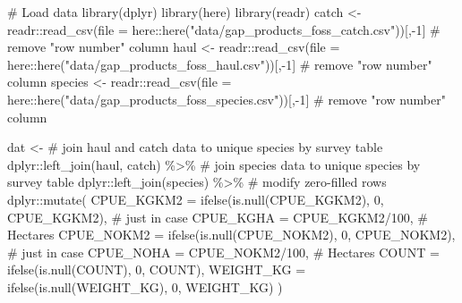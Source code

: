 \documentclass[
  letterpaper,
  oneside,
  open=any]{scrbook}
\newenvironment{Shaded}{\begin{snugshade}}{\end{snugshade}}
\newcommand{\AttributeTok}[1]{\textcolor[rgb]{0.40,0.45,0.13}{#1}}
\newcommand{\CommentTok}[1]{\textcolor[rgb]{0.37,0.37,0.37}{#1}}
\newcommand{\DecValTok}[1]{\textcolor[rgb]{0.68,0.00,0.00}{#1}}
\newcommand{\FunctionTok}[1]{\textcolor[rgb]{0.28,0.35,0.67}{#1}}
\newcommand{\NormalTok}[1]{\textcolor[rgb]{0.00,0.23,0.31}{#1}}
\newcommand{\OtherTok}[1]{\textcolor[rgb]{0.00,0.23,0.31}{#1}}
\newcommand{\SpecialCharTok}[1]{\textcolor[rgb]{0.37,0.37,0.37}{#1}}
\newcommand{\StringTok}[1]{\textcolor[rgb]{0.13,0.47,0.30}{#1}}
\begin{document}
\begin{Shaded}
\begin{Highlighting}[]
\CommentTok{\# Load data}
\FunctionTok{library}\NormalTok{(dplyr)}
\FunctionTok{library}\NormalTok{(here)}
\FunctionTok{library}\NormalTok{(readr)}
\NormalTok{catch }\OtherTok{\textless{}{-}}\NormalTok{ readr}\SpecialCharTok{::}\FunctionTok{read\_csv}\NormalTok{(}\AttributeTok{file =}\NormalTok{ here}\SpecialCharTok{::}\FunctionTok{here}\NormalTok{(}\StringTok{"data/gap\_products\_foss\_catch.csv"}\NormalTok{))[,}\SpecialCharTok{{-}}\DecValTok{1}\NormalTok{] }\CommentTok{\# remove "row number" column}
\NormalTok{haul }\OtherTok{\textless{}{-}}\NormalTok{ readr}\SpecialCharTok{::}\FunctionTok{read\_csv}\NormalTok{(}\AttributeTok{file =}\NormalTok{ here}\SpecialCharTok{::}\FunctionTok{here}\NormalTok{(}\StringTok{"data/gap\_products\_foss\_haul.csv"}\NormalTok{))[,}\SpecialCharTok{{-}}\DecValTok{1}\NormalTok{] }\CommentTok{\# remove "row number" column}
\NormalTok{species }\OtherTok{\textless{}{-}}\NormalTok{ readr}\SpecialCharTok{::}\FunctionTok{read\_csv}\NormalTok{(}\AttributeTok{file =}\NormalTok{ here}\SpecialCharTok{::}\FunctionTok{here}\NormalTok{(}\StringTok{"data/gap\_products\_foss\_species.csv"}\NormalTok{))[,}\SpecialCharTok{{-}}\DecValTok{1}\NormalTok{] }\CommentTok{\# remove "row number" column}

\NormalTok{dat }\OtherTok{\textless{}{-}} 
  \CommentTok{\# join haul and catch data to unique species by survey table}
\NormalTok{  dplyr}\SpecialCharTok{::}\FunctionTok{left\_join}\NormalTok{(haul, catch) }\SpecialCharTok{\%\textgreater{}\%} 
  \CommentTok{\# join species data to unique species by survey table}
\NormalTok{  dplyr}\SpecialCharTok{::}\FunctionTok{left\_join}\NormalTok{(species) }\SpecialCharTok{\%\textgreater{}\%} 
  \CommentTok{\# modify zero{-}filled rows}
\NormalTok{  dplyr}\SpecialCharTok{::}\FunctionTok{mutate}\NormalTok{(}
    \AttributeTok{CPUE\_KGKM2 =} \FunctionTok{ifelse}\NormalTok{(}\FunctionTok{is.null}\NormalTok{(CPUE\_KGKM2), }\DecValTok{0}\NormalTok{, CPUE\_KGKM2), }\CommentTok{\# just in case}
    \AttributeTok{CPUE\_KGHA =}\NormalTok{ CPUE\_KGKM2}\SpecialCharTok{/}\DecValTok{100}\NormalTok{, }\CommentTok{\# Hectares}
    \AttributeTok{CPUE\_NOKM2 =} \FunctionTok{ifelse}\NormalTok{(}\FunctionTok{is.null}\NormalTok{(CPUE\_NOKM2), }\DecValTok{0}\NormalTok{, CPUE\_NOKM2), }\CommentTok{\# just in case}
    \AttributeTok{CPUE\_NOHA =}\NormalTok{ CPUE\_NOKM2}\SpecialCharTok{/}\DecValTok{100}\NormalTok{, }\CommentTok{\# Hectares}
    \AttributeTok{COUNT =} \FunctionTok{ifelse}\NormalTok{(}\FunctionTok{is.null}\NormalTok{(COUNT), }\DecValTok{0}\NormalTok{, COUNT),}
    \AttributeTok{WEIGHT\_KG =} \FunctionTok{ifelse}\NormalTok{(}\FunctionTok{is.null}\NormalTok{(WEIGHT\_KG), }\DecValTok{0}\NormalTok{, WEIGHT\_KG) )}
\end{Highlighting}
\end{Shaded}
\end{document}

